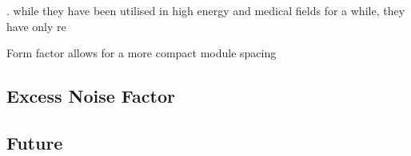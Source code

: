 . while they have been utilised in high energy and medical fields for a while, they have only re

Form factor allows for a more compact module spacing 





\subsection{Excess Noise Factor} \label{section:enf}

\subsection{Future}






